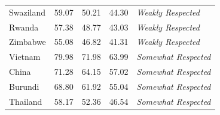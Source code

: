 \documentclass[]{article}
\begin{document}
\begin{table}[!htb]
{\begin{tabular}{@{}lcccl@{}}
            Swaziland  & 59.07                                                                                  & 50.21                                                                                             & 44.30                                                                                               & \textit{Weakly Respected}                          \\
            Rwanda     & 57.38                                                                                  & 48.77                                                                                             & 43.03                                                                                               & \textit{Weakly Respected}                          \\
            Zimbabwe   & 55.08                                                                                  & 46.82                                                                                             & 41.31                                                                                               & \textit{Weakly Respected}                          \\
            Vietnam    & 79.98                                                                                  & 71.98                                                                                             & 63.99                                                                                               & \textit{Somewhat Respected}                        \\
            China      & 71.28                                                                                  & 64.15                                                                                             & 57.02                                                                                               & \textit{Somewhat Respected}                        \\
            Burundi    & 68.80                                                                                  & 61.92                                                                                             & 55.04                                                                                               & \textit{Somewhat Respected}                        \\
            Thailand   & 58.17                                                                                  & 52.36                                                                                             & 46.54                                                                                               & \textit{Somewhat Respected}                        \\

\end{tabular}}
\end{table}
\end{document}
